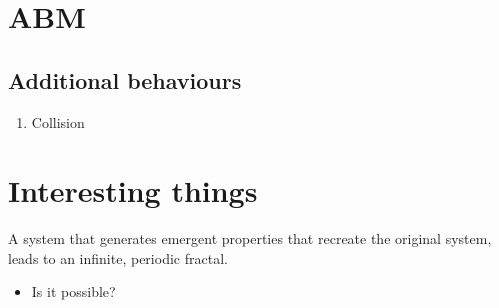 \documentclass{article}
\begin{document}
\section{ABM}

  \subsection{Additional behaviours}
    \begin{enumerate}[label=\textbf{\alph*)}]
      \item Collision

    \end{enumerate}


\section{Interesting things}

  A system that generates emergent properties that recreate the original system, leads to an infinite, periodic fractal. 
  \begin{itemize}
    \item Is it possible?
  \end{itemize}
\end{document}

